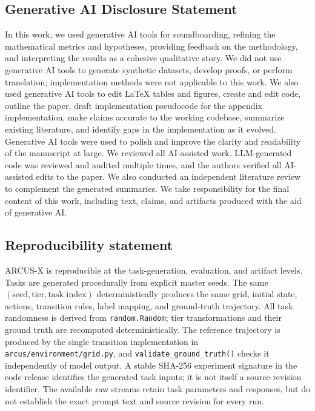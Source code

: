 \documentclass{article}
\begin{document}
\subsection*{Generative AI Disclosure Statement}

In this work, we used generative AI tools for soundboarding, refining the mathematical metrics and hypotheses, providing feedback on the methodology, and interpreting the results as a cohesive qualitative story. We did not use generative AI tools to generate synthetic datasets, develop proofs, or perform translation; implementation methods were not applicable to this work. We also used generative AI tools to edit LaTeX tables and figures, create and edit code, outline the paper, draft implementation pseudocode for the appendix implementation, make claims accurate to the working codebase, summarize existing literature, and identify gaps in the implementation as it evolved. Generative AI tools were used to polish and improve the clarity and readability of the manuscript at large. We reviewed all AI-assisted work. LLM-generated code was reviewed and audited multiple times, and the authors verified all AI-assisted edits to the paper. We also conducted an independent literature review to complement the generated summaries. We take responsibility for the final content of this work, including text, claims, and artifacts produced with the aid of generative AI.

\subsection*{Reproducibility statement}
ARCUS-X is reproducible at the task-generation, evaluation, and artifact levels.
Tasks are generated procedurally from explicit master seeds. The same
$(\text{seed},\text{tier},\text{task index})$ deterministically produces the
same grid, initial state, actions, transition rules, label mapping, and
ground-truth trajectory. All task randomness is derived from
\texttt{random.Random}; tier transformations and their ground truth are
recomputed deterministically. The reference trajectory is produced by the
single transition implementation in \texttt{arcus/environment/grid.py}, and
\texttt{validate\_ground\_truth()} checks it independently of model output.
A stable SHA-256 experiment signature in the code release identifies
the generated task inputs; it is not itself a source-revision identifier. The available raw streams retain task parameters and responses, but do
not establish the exact prompt text and source revision for every run.
\end{document}
